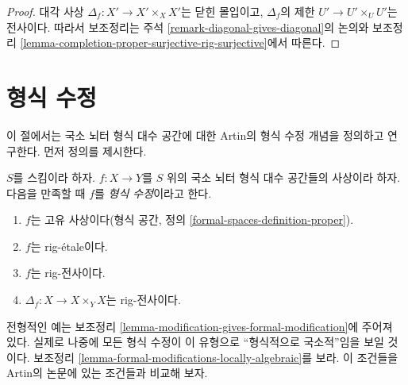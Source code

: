 \begin{proof}
대각 사상 $\Delta_f : X' \to X' \times_X X'$는 닫힌 몰입이고,
$\Delta_f$의 제한 $U' \to U' \times_U U'$는 전사이다.
따라서 보조정리는 주석 \ref{remark-diagonal-gives-diagonal}의 논의와
보조정리 \ref{lemma-completion-proper-surjective-rig-surjective}에서 따른다.
\end{proof}

\section{형식 수정}
\label{section-formal-modifications}

\noindent
이 절에서는 국소 뇌터 형식 대수 공간에 대한 Artin의 형식 수정 개념을
정의하고 연구한다. 먼저 정의를 제시한다.

\begin{definition}
\label{definition-formal-modification}
$S$를 스킴이라 하자. $f : X \to Y$를 $S$ 위의 국소 뇌터
형식 대수 공간들의 사상이라 하자. 다음을 만족할 때 $f$를
{\it 형식 수정}이라고 한다.
\begin{enumerate}
\item $f$는 고유 사상이다(형식 공간, 정의
\ref{formal-spaces-definition-proper}).
\item $f$는 rig-\'etale이다.
\item $f$는 rig-전사이다.
\item $\Delta_f : X \to X \times_Y X$는 rig-전사이다.
\end{enumerate}
\end{definition}

\noindent
전형적인 예는 보조정리
\ref{lemma-modification-gives-formal-modification}에 주어져 있다.
실제로 나중에 모든 형식 수정이 이 유형으로 “형식적으로 국소적”임을
보일 것이다. 보조정리
\ref{lemma-formal-modifications-locally-algebraic}를 보라.
이 조건들을 Artin의 논문에 있는 조건들과 비교해 보자.

